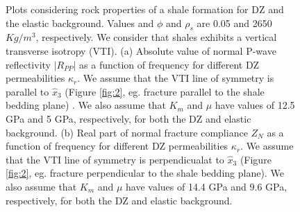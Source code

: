 \documentclass[draft,jgrga]{agutexSI2019}
\begin{document}
\begin{figure}[hp]
\centering
\caption {Plots considering  rock properties of a shale formation for DZ and the elastic background. Values  and $\phi$ and $\rho_s$ are 0.05 and 2650 $Kg/m^3$, respectively. We consider that shales exhibits a vertical transverse isotropy (VTI).   (a) Absolute value of normal P-wave reflectivity $|R_{PP}|$ as a function of frequency for different DZ permeabilities $\kappa_r$. We assume that the VTI line of symmetry is parallel to $\hat x_3$ (Figure \ref{fig:2}, eg. fracture parallel to the shale bedding plane) . We also assume that $K_m$ and $\mu$ have values of  12.5 GPa and 5 GPa, respectively, for both the DZ and elastic background.
(b) Real part of normal fracture compliance $Z_N$ as a function of frequency for different DZ permeabilities $\kappa_r$.  We assume that the VTI line of symmetry is perpendicualat to $\hat x_3$ (Figure \ref{fig:2}, eg. fracture perpendicular to the shale bedding plane). We also assume that $K_m$ and $\mu$ have values of  14.4 GPa and 9.6 GPa, respectively, for both the DZ and elastic background.}


\label{fig:8}
\end{figure}
\end{document}
